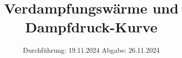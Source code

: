 

\subject{V203}
\title{Verdampfungswärme und Dampfdruck-Kurve}
\date{%
  Durchführung: 19.11.2024
  \hspace{3em}
  Abgabe: 26.11.2024
}



\maketitle
\thispagestyle{empty}
\tableofcontents
\newpage






\printbibliography{}


